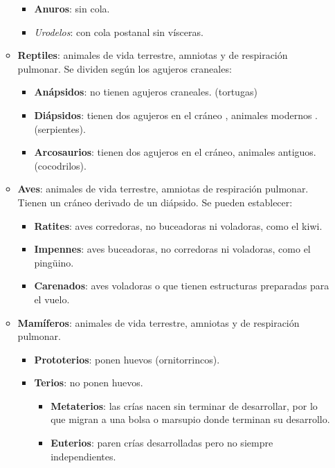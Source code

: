 \begin{itemize}[itemsep=0pt,parsep=0pt,topsep=0pt,partopsep=0pt]
\begin{itemize}[itemsep=0pt,parsep=0pt,topsep=0pt,partopsep=0pt]
        \begin{itemize}[itemsep=0pt,parsep=0pt,topsep=0pt,partopsep=0pt]
            \item \textbf{Anuros}: sin cola.
            \item\textit{Urodelos}: con cola postanal sin vísceras.
        \end{itemize}
        \item\textbf{Reptiles}: animales de vida terrestre, amniotas y de respiración pulmonar. Se dividen según los agujeros craneales:
        \begin{itemize}[itemsep=0pt,parsep=0pt,topsep=0pt,partopsep=0pt]
            \item \textbf{Anápsidos}: no tienen agujeros craneales. (tortugas)
            \item\textbf{Diápsidos}: tienen dos agujeros en el cráneo , animales modernos . (serpientes).
            \item\textbf{Arcosaurios}: tienen dos agujeros en el cráneo, animales antiguos. (cocodrilos).
        \end{itemize}
        \item\textbf{Aves}: animales de vida terrestre, amniotas de respiración pulmonar. Tienen un cráneo derivado de un diápsido. Se pueden establecer:
        \begin{itemize}[itemsep=0pt,parsep=0pt,topsep=0pt,partopsep=0pt]
            \item \textbf{Ratites}: aves corredoras, no buceadoras ni voladoras, como el kiwi.
            \item\textbf{Impennes}: aves buceadoras, no corredoras ni voladoras, como el pingüino.
            \item\textbf{Carenados}: aves voladoras o que tienen estructuras preparadas para el vuelo.
        \end{itemize}
        \item\textbf{Mamíferos}: animales de vida terrestre, amniotas y de respiración pulmonar.
        \begin{itemize}[itemsep=0pt,parsep=0pt,topsep=0pt,partopsep=0pt]
            \item \textbf{Prototerios}: ponen huevos (ornitorrincos).
            \item\textbf{Terios}: no ponen huevos.
            \begin{itemize}[itemsep=0pt,parsep=0pt,topsep=0pt,partopsep=0pt]
                \item \textbf{Metaterios}: las crías nacen sin terminar de desarrollar, por lo que migran a una bolsa o marsupio donde terminan su desarrollo.
                \item\textbf{Euterios}: paren crías desarrolladas pero no siempre independientes.
            \end{itemize}
        \end{itemize}
    \end{itemize}
\end{itemize}
